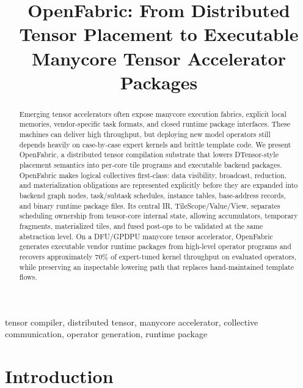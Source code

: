\documentclass[conference]{IEEEtran}
\newcommand{\systemname}{OpenFabric}
\newcommand{\targetbackend}{DFU/GPDPU}
\newcommand{\expertperf}{70\%}
\begin{document}
\title{\systemname: From Distributed Tensor Placement to Executable Manycore Tensor Accelerator Packages}

\author{
}

\maketitle

\begin{abstract}
Emerging tensor accelerators often expose manycore execution fabrics, explicit
local memories, vendor-specific task formats, and closed runtime package
interfaces. These machines can deliver high throughput, but deploying new model
operators still depends heavily on case-by-case expert kernels and brittle
template code. We present \systemname, a distributed tensor compilation
substrate that lowers DTensor-style placement semantics into per-core tile
programs and executable backend packages. \systemname{} makes logical
collectives first-class: data visibility, broadcast, reduction, and
materialization obligations are represented explicitly before they are expanded
into backend graph nodes, task/subtask schedules, instance tables, base-address
records, and binary runtime package files. Its central IR, TileScope/Value/View,
separates scheduling ownership from tensor-core internal state, allowing
accumulators, temporary fragments, materialized tiles, and fused post-ops to be
validated at the same abstraction level. On a \targetbackend{} manycore tensor
accelerator, \systemname{} generates executable vendor runtime packages from
high-level operator programs and recovers approximately \expertperf{} of
expert-tuned kernel throughput on evaluated operators, while preserving an
inspectable lowering path that replaces hand-maintained template flows.
\end{abstract}

\begin{IEEEkeywords}
tensor compiler, distributed tensor, manycore accelerator, collective
communication, operator generation, runtime package
\end{IEEEkeywords}

\section{Introduction}
\end{document}

